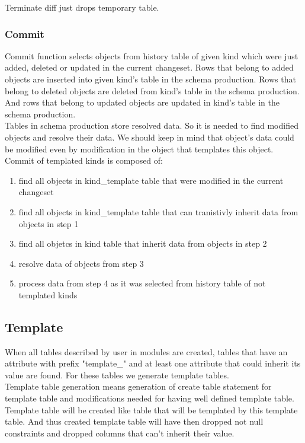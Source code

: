 \documentclass[deska]{subfiles}
\begin{document}
Terminate diff just drops temporary table.

\subsubsection{Commit}
Commit function selects objects from history table of given kind which were just added, deleted or updated in the current changeset. Rows that belong to added objects are inserted into given kind's table in the schema production. Rows that belong to deleted objects are deleted from kind's table in the schema production. And rows that belong to updated objects are updated in kind's table in the schema production.\\
Tables in schema production store resolved data. So it is needed to find modified objects and resolve their data. We should keep in mind that object's data could be modified even by modification in the object that templates this object.\\
Commit of templated kinds is composed of:
\begin{enumerate}
    \item find all objects in kind\_template table that were modified in the current changeset
    \item find all objects in kind\_template table that can tranistivly inherit data from objects in step 1
    \item find all objetcs in kind table that inherit data from objects in step 2
    \item resolve data of objects from step 3
    \item process data from step 4 as it was selected from history table of not templated kinds
\end{enumerate}


\subsection{Template}
When all tables described by user in modules are created, tables that have an attribute with prefix "template\_" and at least one attribute that could inherit its value are found. For these tables we generate template tables.\\
Template table generation means generation of create table statement for template table and modifications needed for having well defined template table.
Template table will be created like table that will be templated by this template table. And thus created template table will have then dropped not null constraints and dropped columns that can't inherit their value.
\end{document}
